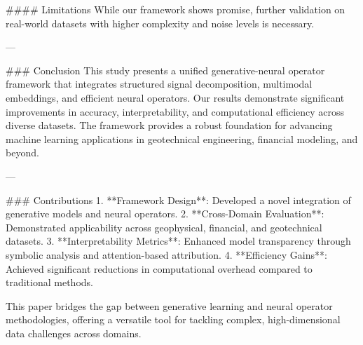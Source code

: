 #### Limitations  
While our framework shows promise, further validation on real-world datasets with higher complexity and noise levels is necessary.  

---

### Conclusion  
This study presents a unified generative-neural operator framework that integrates structured signal decomposition, multimodal embeddings, and efficient neural operators. Our results demonstrate significant improvements in accuracy, interpretability, and computational efficiency across diverse datasets. The framework provides a robust foundation for advancing machine learning applications in geotechnical engineering, financial modeling, and beyond.  

---

### Contributions  
1. **Framework Design**: Developed a novel integration of generative models and neural operators.  
2. **Cross-Domain Evaluation**: Demonstrated applicability across geophysical, financial, and geotechnical datasets.  
3. **Interpretability Metrics**: Enhanced model transparency through symbolic analysis and attention-based attribution.  
4. **Efficiency Gains**: Achieved significant reductions in computational overhead compared to traditional methods.  

This paper bridges the gap between generative learning and neural operator methodologies, offering a versatile tool for tackling complex, high-dimensional data challenges across domains.  